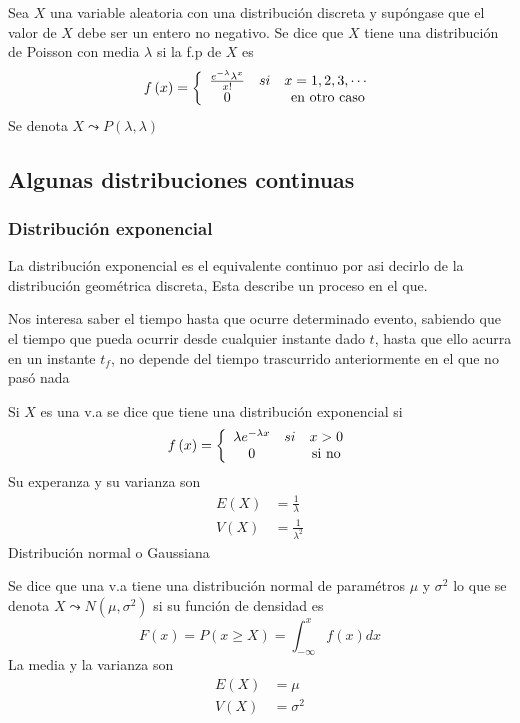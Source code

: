 Sea $X$ una variable aleatoria con una distribuci\'{o}n discreta y
sup\'{o}ngase que el valor de $X$ debe ser un entero no negativo. Se dice que
$X$ tiene una distribuci\'{o}n de Poisson con media $\lambda$ si la f.p de $X$
es
\[
f\left(  x\right)  =\left\{
\begin{array}
[c]{ccc}%
\frac{e^{-\lambda}\lambda^{x}}{x!} & si & x=1,2,3,\cdots\\
0 &  & \text{ en otro caso}%
\end{array}
\right.
\]
Se denota $X\leadsto P\left(  \lambda,\lambda\right)  $

\subsection{Algunas distribuciones continuas}

\subsubsection{Distribuci\'{o}n exponencial}

La distribuci\'{o}n exponencial es el equivalente continuo por asi decirlo de
la distribuci\'{o}n geom\'{e}trica discreta, Esta describe un proceso en el que.

Nos interesa saber el tiempo hasta que ocurre determinado evento, sabiendo que
el tiempo que pueda ocurrir desde cualquier instante dado $t$, hasta que ello
acurra en un instante $t_{f}$, no depende del tiempo trascurrido anteriormente
en el que no pas\'{o} nada

Si $X$ es una v.a se dice que tiene una distribuci\'{o}n exponencial si
\[
f\left(  x\right)  =\left\{
\begin{array}
[c]{ccc}%
\lambda e^{-\lambda x} & si & x>0\\
0 &  & \text{si no}%
\end{array}
\right.
\]
Su experanza y su varianza son
\begin{align*}
E\left(  X\right)   &  =\frac{1}{\lambda}\\
V\left(  X\right)   &  =\frac{1}{\lambda^{2}}%
\end{align*}
Distribuci\'{o}n normal o Gaussiana

Se dice que una v.a tiene una distribuci\'{o}n normal de param\'{e}tros $\mu$
y $\sigma^{2}$ lo que se denota $X\leadsto N\left(  \mu,\sigma^{2}\right)  $
si su funci\'{o}n de densidad es
\[
F\left(  x\right)  =P\left(  x\geq X\right)  =\int_{-\infty}^{x}f\left(
x\right)  dx
\]
La media y la varianza son
\begin{align*}
E\left(  X\right)   &  =\mu\\
V\left(  X\right)   &  =\sigma^{2}%
\end{align*}

